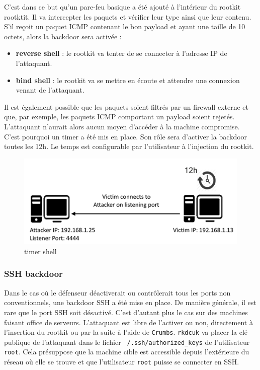 \documentclass[12pt]{article}
\begin{document}
C'est dans ce but qu'un pare-feu basique a été ajouté à l'intérieur du rootkit rootktit. Il va intercepter les paquets et  vérifier leur type ainsi que leur contenu. S'il reçoit un paquet ICMP contenant le bon payload et ayant une taille de 10 octets, alors la backdoor sera activée :
\begin{itemize}
 \item \textbf{reverse shell} : le rootkit va tenter de se connecter à l'adresse IP de l'attaquant.
 \item \textbf{bind shell} : le rootkit va se mettre en écoute et attendre une connexion venant de l'attaquant.
\end{itemize}

    Il est également possible que les paquets soient filtrés par un firewall externe et que, par exemple, les paquets ICMP comportant un payload soient rejetés. L'attaquant n'aurait alors aucun moyen d'accéder à la machine compromise. C'est pourquoi un timer a été mis en place. Son rôle sera d'activer la backdoor toutes les 12h. Le temps est configurable par l'utilisateur à l'injection du rootkit.
        
\begin{figure}[H] 
\begin{center}
\includegraphics{./img/timer-shell.png}

\caption[dsfsdf]{timer shell}
\end{center}
\end{figure}
                    
            
        \subsubsection{SSH backdoor}
        
        	Dans le cas où le défenseur déactiverait ou contrôlerait tous les ports non conventionnels, une backdoor SSH a été mise en place. De manière générale, il est rare que le port SSH soit désactivé. C'est d'autant plus le cas sur des machines faisant office de serveurs. L'attaquant est libre de l'activer ou non, directement à l'insertion du rootkit ou par la suite à l'aide de \texttt{Crumbs}. \texttt{rkdcuk} va placer la clé publique de l'attaquant dans le fichier \texttt{~/.ssh/authorized\_keys} de l'utilisateur \texttt{root}. Cela présuppose que la machine cible est accessible depuis l'extérieure du réseau où elle se trouve et que l'utilisateur \texttt{root} puisse se connecter en SSH. \\
            
\end{document}
